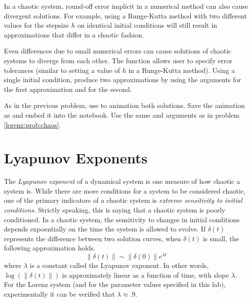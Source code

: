 In a chaotic system, round-off error implicit in a numerical method can also cause divergent solutions. For example, using a Runge-Kutta method with two different values for the stepsize $h$ on identical initial conditions will still result in approximations that differ in a chaotic fashion.

\begin{problem}
Even differences due to small numerical errors can cause solutions of chaotic systems to diverge from each other.
The  function allows user to specify error tolerances (similar to setting a value of $h$ in a Runge-Kutta method). 
Using a single initial condition, produce two approximations by using the  arguments  for the first approximation and  for the second.

As in the previous problem, use  to animation both solutions. 
Save the animation as  and embed it into the notebook.
Use the same  and  arguments as in problem \ref{lorenz:prob:chaos}.
\end{problem}

\section*{Lyapunov Exponents}
The \textit{Lyapunov exponent} of a dynamical system is one measure of how chaotic a system is.
While there are more conditions for a system to be considered chaotic, one of the primary indicators of a chaotic system is \textit{extreme sensitivity to initial conditions}.
Strictly speaking, this is saying that a chaotic system is poorly conditioned.
In a chaotic system, the sensitivity to changes in initial conditions depends expoentially on the time the system is allowed to evolve.
If $\delta(t)$ represents the difference between two solution curves, when $\delta(t)$ is small, the following approximation holds.
\[\|\delta(t)\| \sim \|\delta(0)\| e^{\lambda t}\]
where $\lambda$ is a constant called the Lyapunov exponent. In other words, $\log(\|\delta(t)\|)$ is approximately linear as a function of time, with slope $\lambda$.
For the Lorenz system (and for the parameter values specified in this lab), experimentally it can be verified that $\lambda \approx .9$.

